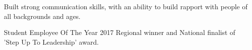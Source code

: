 \begin{tightemize}
  \item Built strong communication skills, with an ability to build rapport with people of all backgrounds and ages.
  \item Student Employee Of The Year 2017 Regional winner and National finalist of 'Step Up To Leadership' award.
\end{tightemize}
\sectionsep